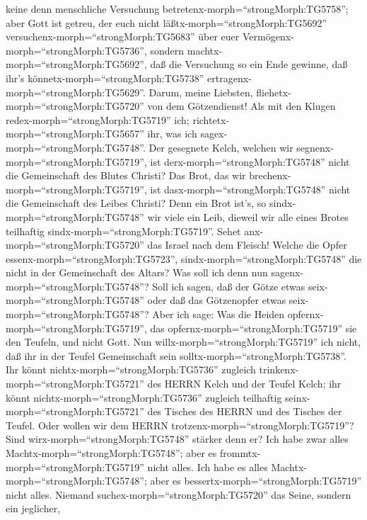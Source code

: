 keine denn menschliche Versuchung
betretenx-morph=``strongMorph:TG5758''; aber Gott ist getreu, der euch
nicht läßtx-morph=``strongMorph:TG5692''
versuchenx-morph=``strongMorph:TG5683'' über euer
Vermögenx-morph=``strongMorph:TG5736'', sondern
machtx-morph=``strongMorph:TG5692'', daß die Versuchung so ein Ende
gewinne, daß ihr's könnetx-morph=``strongMorph:TG5738''
ertragenx-morph=``strongMorph:TG5629''.  Darum, meine
Liebsten, fliehetx-morph=``strongMorph:TG5720'' von dem Götzendienst!
 Als mit den Klugen redex-morph=``strongMorph:TG5719'' ich;
richtetx-morph=``strongMorph:TG5657'' ihr, was ich
sagex-morph=``strongMorph:TG5748''.  Der gesegnete Kelch,
welchen wir segnenx-morph=``strongMorph:TG5719'', ist
derx-morph=``strongMorph:TG5748'' nicht die Gemeinschaft des Blutes
Christi? Das Brot, das wir brechenx-morph=``strongMorph:TG5719'', ist
dasx-morph=``strongMorph:TG5748'' nicht die Gemeinschaft des Leibes
Christi?  Denn ein Brot ist's, so
sindx-morph=``strongMorph:TG5748'' wir viele ein Leib, dieweil wir alle
eines Brotes teilhaftig sindx-morph=``strongMorph:TG5719''.
 Sehet anx-morph=``strongMorph:TG5720'' das Israel nach dem
Fleisch! Welche die Opfer essenx-morph=``strongMorph:TG5723'',
sindx-morph=``strongMorph:TG5748'' die nicht in der Gemeinschaft des
Altars?  Was soll ich denn nun
sagenx-morph=``strongMorph:TG5748''? Soll ich sagen, daß der Götze etwas
seix-morph=``strongMorph:TG5748'' oder daß das Götzenopfer etwas
seix-morph=``strongMorph:TG5748''?  Aber ich sage: Was die
Heiden opfernx-morph=``strongMorph:TG5719'', das
opfernx-morph=``strongMorph:TG5719'' sie den Teufeln, und nicht Gott.
Nun willx-morph=``strongMorph:TG5719'' ich nicht, daß ihr in der Teufel
Gemeinschaft sein solltx-morph=``strongMorph:TG5738''.  Ihr
könnt nichtx-morph=``strongMorph:TG5736'' zugleich
trinkenx-morph=``strongMorph:TG5721'' des HERRN Kelch und der Teufel
Kelch; ihr könnt nichtx-morph=``strongMorph:TG5736'' zugleich teilhaftig
seinx-morph=``strongMorph:TG5721'' des Tisches des HERRN und des Tisches
der Teufel.  Oder wollen wir dem HERRN
trotzenx-morph=``strongMorph:TG5719''? Sind
wirx-morph=``strongMorph:TG5748'' stärker denn er?  Ich
habe zwar alles Machtx-morph=``strongMorph:TG5748''; aber es
frommtx-morph=``strongMorph:TG5719'' nicht alles. Ich habe es alles
Machtx-morph=``strongMorph:TG5748''; aber es
bessertx-morph=``strongMorph:TG5719'' nicht alles.  Niemand
suchex-morph=``strongMorph:TG5720'' das Seine, sondern ein jeglicher,
